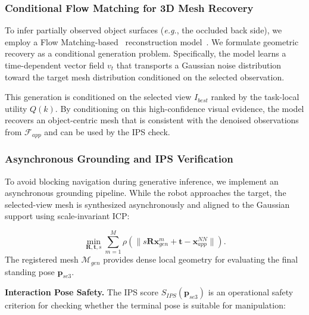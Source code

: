 \documentclass[conference]{IEEEtran}
\begin{document}
\subsubsection{Conditional Flow Matching for 3D Mesh Recovery}
%
To infer partially observed object surfaces (\emph{e.g.}, the occluded back side), we employ a Flow Matching-based~\cite{lipman2022flow} reconstruction model~\cite{chen2025sam}.
%
We formulate geometric recovery as a conditional generation problem.
%
Specifically, the model learns a time-dependent vector field $v_t$ that transports a Gaussian noise distribution toward the target mesh distribution conditioned on the selected observation.
%


This generation is conditioned on the selected view $I_{best}$ ranked by the task-local utility $Q(k)$.
%
By conditioning on this high-confidence visual evidence, the model recovers an object-centric mesh that is consistent with the denoised observations from $\mathcal{F}_{app}$ and can be used by the IPS check.

\subsubsection{Asynchronous Grounding and IPS Verification}
%
To avoid blocking navigation during generative inference, we implement an asynchronous grounding pipeline.
%
While the robot approaches the target, the selected-view mesh is synthesized asynchronously and aligned to the Gaussian support using scale-invariant ICP:


\begin{equation}
    \min_{\mathbf{R}, \mathbf{t}, s} \sum_{m=1}^M \rho \left( \|s \mathbf{R} \mathbf{x}_{gen}^m + \mathbf{t} - \mathbf{x}_{app}^{NN}\| \right) .
\end{equation}
%
The registered mesh $\mathcal{M}_{gen}$ provides dense local geometry for evaluating the final standing pose $\mathbf{p}_{se3}$.
%

\vspace{1mm}
\noindent \textbf{Interaction Pose Safety.}
The IPS score $S_{IPS}(\mathbf{p}_{se3})$ is an operational safety criterion for checking whether the terminal pose is suitable for manipulation:
\end{document}

